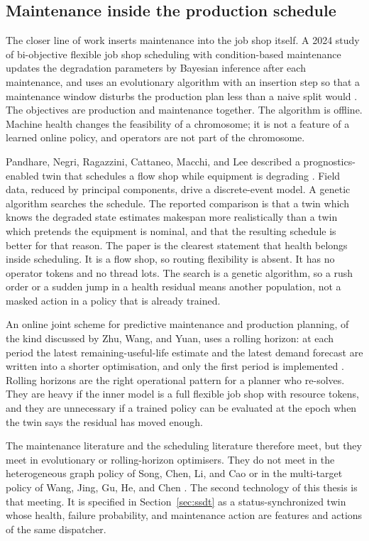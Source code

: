 \subsection{Maintenance inside the production schedule}

The closer line of work inserts maintenance into the job shop itself. A 2024 study of bi-objective flexible job shop scheduling with condition-based maintenance updates the degradation parameters by Bayesian inference after each maintenance, and uses an evolutionary algorithm with an insertion step so that a maintenance window disturbs the production plan less than a naive split would \cite{cbm2024}. The objectives are production and maintenance together. The algorithm is offline. Machine health changes the feasibility of a chromosome; it is not a feature of a learned online policy, and operators are not part of the chromosome.

Pandhare, Negri, Ragazzini, Cattaneo, Macchi, and Lee described a prognostics-enabled twin that schedules a flow shop while equipment is degrading \cite{pandhare2024}. Field data, reduced by principal components, drive a discrete-event model. A genetic algorithm searches the schedule. The reported comparison is that a twin which knows the degraded state estimates makespan more realistically than a twin which pretends the equipment is nominal, and that the resulting schedule is better for that reason. The paper is the clearest statement that health belongs inside scheduling. It is a flow shop, so routing flexibility is absent. It has no operator tokens and no thread lots. The search is a genetic algorithm, so a rush order or a sudden jump in a health residual means another population, not a masked action in a policy that is already trained.

An online joint scheme for predictive maintenance and production planning, of the kind discussed by Zhu, Wang, and Yuan, uses a rolling horizon: at each period the latest remaining-useful-life estimate and the latest demand forecast are written into a shorter optimisation, and only the first period is implemented \cite{zhu2024pdm}. Rolling horizons are the right operational pattern for a planner who re-solves. They are heavy if the inner model is a full flexible job shop with resource tokens, and they are unnecessary if a trained policy can be evaluated at the epoch when the twin says the residual has moved enough.

The maintenance literature and the scheduling literature therefore meet, but they meet in evolutionary or rolling-horizon optimisers. They do not meet in the heterogeneous graph policy of Song, Chen, Li, and Cao \cite{song2023} or in the multi-target policy of Wang, Jing, Gu, He, and Chen \cite{wang2025}. The second technology of this thesis is that meeting. It is specified in Section~\ref{sec:ssdt} as a status-synchronized twin whose health, failure probability, and maintenance action are features and actions of the same dispatcher.

